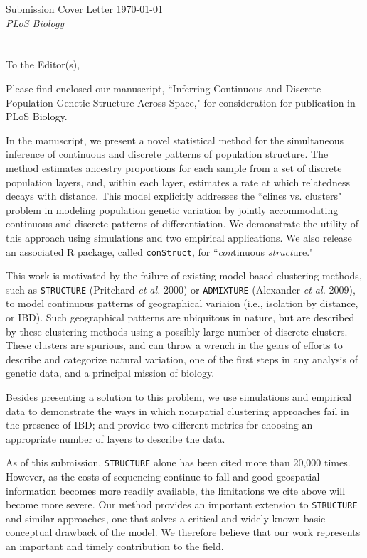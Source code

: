 \documentclass[11pt]{letter}
\begin{document}
Submission Cover Letter \hfill	\today\\
\emph{PLoS Biology}
\\\\\\
To the Editor(s),

Please find enclosed our manuscript,  
``Inferring Continuous and Discrete Population Genetic Structure Across Space,"
for consideration for publication in PLoS Biology.

In the manuscript, we present a novel statistical method 
for the simultaneous inference of continuous and discrete patterns of population structure.
The method estimates ancestry proportions for each 
sample from a set of discrete population layers, 
and, within each layer, estimates a rate at which relatedness decays with distance.
This model explicitly addresses the ``clines vs. clusters" problem in 
modeling population genetic variation by jointly accommodating 
continuous and discrete patterns of differentiation. 
We demonstrate the utility of this approach using simulations 
and two empirical applications.
We also release an associated R package, called \texttt{conStruct}, 
for ``\emph{con}tinuous \emph{struct}ure."

This work is motivated by the failure of existing model-based clustering methods, 
such as \texttt{STRUCTURE} (Pritchard \emph{et al.} 2000)
or \texttt{ADMIXTURE} (Alexander \emph{et al.} 2009), 
to model continuous patterns of geographical variaion (i.e., isolation by distance, or IBD).
Such geographical patterns are ubiquitous in nature,
but are described by these clustering methods using a possibly large number of discrete clusters.
These clusters are spurious, and can throw a 
wrench in the gears of efforts to describe and categorize natural variation, 
one of the first steps in any analysis of genetic data, 
and a principal mission of biology.  

Besides presenting a solution to this problem,
we use simulations and empirical data to demonstrate 
the ways in which nonspatial clustering approaches 
fail in the presence of IBD; 
and provide two different metrics for choosing an appropriate 
number of layers to describe the data.

As of this submission, \texttt{STRUCTURE} alone has been cited more than 20,000 times.
However, as the costs of sequencing continue to fall
and good geospatial information becomes more readily available,
the limitations we cite above will become more severe.
Our method provides an important extension to \texttt{STRUCTURE} and similar approaches, 
one that solves a critical and widely known basic conceptual drawback of the model. 
We therefore believe that our work represents an 
important and timely contribution to the field.
\end{document}
